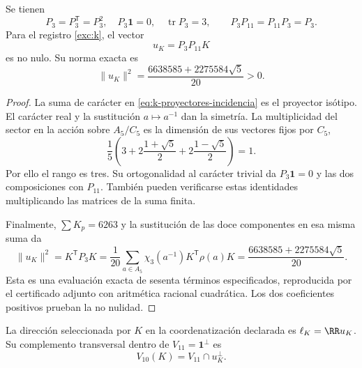 \begin{lemma}
\label{lem:k-sector-no-nulo}
Se tienen
\[
 P_3=P_3^{\mathsf T}=P_3^2,\quad
 P_3\mathbf1=0,\quad \operatorname{tr}P_3=3,
 \qquad P_3P_{11}=P_{11}P_3=P_3.
\]
Para el registro \eqref{exc:k}, el vector
\begin{equation}
 u_K=P_3P_{11}K
 \label{eq:k-vector-direccional}
\end{equation}
es no nulo. Su norma exacta es
\begin{equation}
 \lVert u_K\rVert^2
 =\frac{6638585+2275584\sqrt5}{20}>0.
 \label{eq:k-norma-direccion}
\end{equation}
\end{lemma}
\begin{proof}
La suma de carácter en \eqref{eq:k-proyectores-incidencia} es el
proyector isótipo. El carácter real y la sustitución \(a\mapsto a^{-1}\)
dan la simetría. La multiplicidad del sector en la acción sobre
\(A_5/C_5\) es la dimensión de sus vectores fijos por \(C_5\),
\[
 \frac15\left(3+2\frac{1+\sqrt5}{2}
                 +2\frac{1-\sqrt5}{2}\right)=1.
\]
Por ello el rango es tres. Su ortogonalidad al carácter trivial
da \(P_3\mathbf1=0\) y las dos composiciones con \(P_{11}\).
También pueden verificarse estas identidades multiplicando las
matrices de la suma finita.

Finalmente, \(\sum K_p=6263\) y la sustitución de las doce
componentes en esa misma suma da
\[
 \lVert u_K\rVert^2=K^{\mathsf T}P_3K
 =\frac1{20}\sum_{a\in A_5}
                \chi_3(a^{-1})K^{\mathsf T}\rho(a)K
 =\frac{6638585+2275584\sqrt5}{20}.
\]
Esta es una evaluación exacta de sesenta términos especificados,
reproducida por el certificado adjunto con aritmética racional
cuadrática. Los dos coeficientes positivos prueban la no nulidad.
\end{proof}

\begin{definition}
La dirección seleccionada por \(K\) en la coordenatización declarada es
\(\ell_K=\RR u_K\). Su complemento transversal dentro de
\(V_{11}=\mathbf1^\perp\) es
\[
 V_{10}(K)=V_{11}\cap u_K^\perp.
\]
\end{definition}

